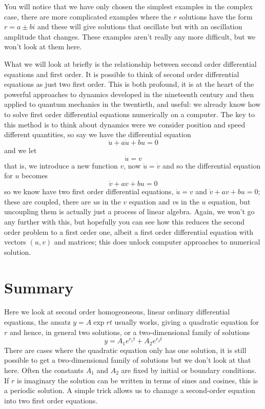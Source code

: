 \documentclass[12pt]{article}
\begin{document}
You will notice that we have only chosen the simplest examples in the
complex case, there are more complicated examples where the $r$
solutions have the form $r=a\pm bi$ and these will give solutions that
oscillate but with an oscillation amplitude that changes. These
examples aren't really any more difficult, but we won't look at them
here.

What we will look at briefly is the relationship between second order
differential equations and first order. It is possible to think of
second order differential equations as just two first order. This is
both profound, it is at the heart of the powerful approaches to
dynamics developed in the nineteenth century and then applied to
quantum mechanics in the twentieth, and useful: we already know how to
solve first order differential equations numerically on a
computer. The key to this method is to think about dynamics were we
consider position and speed different quantities, so say we have the differential equation
\begin{equation}
  \ddot{u}+ a\dot{u}+bu=0
\end{equation}
and we let
\begin{equation}
  \dot{u}=v
\end{equation}
that is, we introduce a new function $v$, now $\ddot{u}=\dot{v}$ and so the differential equation for $u$ becomes
\begin{equation}
  \dot{v}+av+bu=0
\end{equation}
so we know have two first order differential equations, $\dot{u}=v$
and $\dot{v}+av+bu=0$; these are coupled, there are $u$s in the $v$
equation and $v$s in the $u$ equation, but uncoupling them is actually
just a process of linear algebra. Again, we won't go any further with
this, but hopefully you can see how this reduces the second order
problem to a first order one, albeit a first order differential
equation with vectors $(u,v)$ and matrices; this does unlock computer
approaches to numerical solution.

\section*{Summary}
Here we look at second order homogeoneous, linear ordinary
differential equations, the ansatz $y=A\exp{rt}$ usually works, giving
a quadratic equation for $r$ and hence, in general two solutions, or a two-dimensional family of solutions
\begin{equation}
  y=A_1e^{r_1t}+A_2e^{r_2t}
\end{equation}
There are cases where the quadratic equation only has one solution, it
is still possible to get a two-dimensional family of solutions but we
don't look at that here. Often the constants $A_1$ and $A_2$ are fixed
by initial or boundary conditions. If $r$ is imaginary the solution
can be written in terms of sines and cosines, this is a periodic
solution. A simple trick allows us to chanage a second-order equation
into two first order equations.
\end{document}
